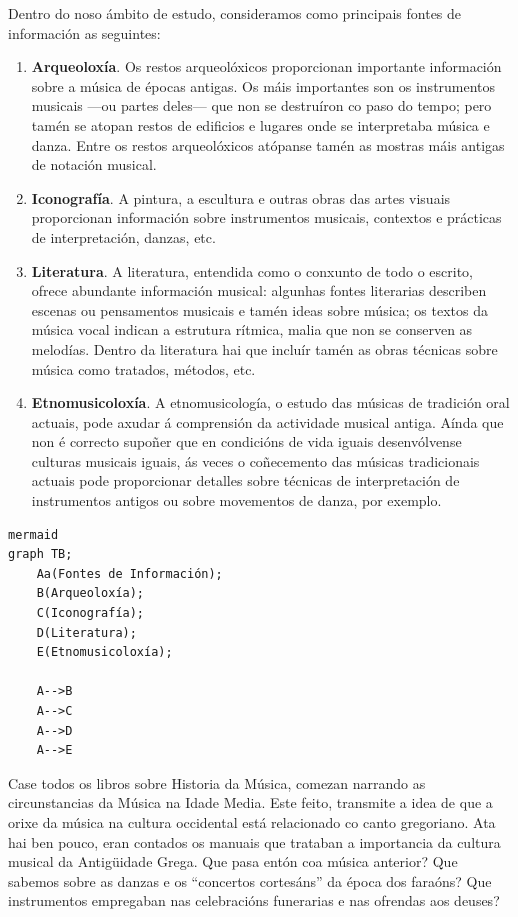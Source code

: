 \documentclass[a4paper, twoside]{templates/ociamthesis}
\providecommand{\tightlist}{%
  \setlength{\itemsep}{0pt}\setlength{\parskip}{0pt}}
\begin{document}
Dentro do noso ámbito de estudo, consideramos como principais fontes de información as seguintes:

\begin{enumerate}
\def\labelenumi{\arabic{enumi}.}
\tightlist
\item
  \textbf{Arqueoloxía}. Os restos arqueolóxicos proporcionan importante información sobre a música de épocas antigas. Os máis importantes son os instrumentos musicais ---ou partes deles--- que non se destruíron co paso do tempo; pero tamén se atopan restos de edificios e lugares onde se interpretaba música e danza. Entre os restos arqueolóxicos atópanse tamén as mostras máis antigas de notación musical.
\item
  \textbf{Iconografía}. A pintura, a escultura e outras obras das artes visuais proporcionan información sobre instrumentos musicais, contextos e prácticas de interpretación, danzas, etc.
\item
  \textbf{Literatura}. A literatura, entendida como o conxunto de todo o escrito, ofrece abundante información musical: algunhas fontes literarias describen escenas ou pensamentos musicais e tamén ideas sobre música; os textos da música vocal indican a estrutura rítmica, malia que non se conserven as melodías. Dentro da literatura hai que incluír tamén as obras técnicas sobre música como tratados, métodos, etc.
\item
  \textbf{Etnomusicoloxía}. A etnomusicología, o estudo das músicas de tradición oral actuais, pode axudar á comprensión da actividade musical antiga. Aínda que non é correcto supoñer que en condicións de vida iguais desenvólvense culturas musicais iguais, ás veces o coñecemento das músicas tradicionais actuais pode proporcionar detalles sobre técnicas de interpretación de instrumentos antigos ou sobre movementos de danza, por exemplo.
\end{enumerate}

\begin{verbatim}
mermaid
graph TB;
    Aa(Fontes de Información);
    B(Arqueoloxía);
    C(Iconografía);
    D(Literatura);
    E(Etnomusicoloxía);
    
    A-->B
    A-->C
    A-->D
    A-->E
\end{verbatim}

Case todos os libros sobre Historia da Música, comezan narrando as circunstancias da Música na Idade Media. Este feito, transmite a idea de que a orixe da música na cultura occidental está relacionado co canto gregoriano. Ata hai ben pouco, eran contados os manuais que trataban a importancia da cultura musical da Antigüidade Grega. Que pasa entón coa música anterior? Que sabemos sobre as danzas e os ``concertos cortesáns'' da época dos faraóns? Que instrumentos empregaban nas celebracións funerarias e nas ofrendas aos deuses?
\end{document}
